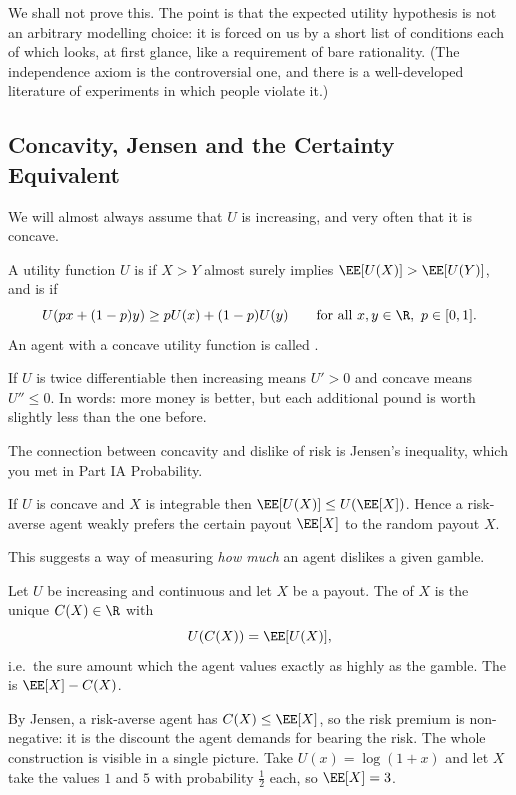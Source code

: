We shall not prove this. The point is that the expected utility hypothesis is not an arbitrary modelling choice: it is forced on us by a short list of conditions each of which looks, at first glance, like a requirement of bare rationality. (The independence axiom is the controversial one, and there is a well-developed literature of experiments in which people violate it.)

\subsection{Concavity, Jensen and the Certainty Equivalent}

We will almost always assume that $U$ is increasing, and very often that it is concave.

\begin{definition}
	A utility function $U$ is  if $X > Y$ almost surely implies $\EE[U(X)] > \EE[U(Y)]$, and is  if
	$$
	U(px + (1-p)y) \geq pU(x) + (1-p)U(y) \qquad \text{for all } x,y \in \R,\ p \in [0,1].
	$$
	An agent with a concave utility function is called .
\end{definition}

If $U$ is twice differentiable then increasing means $U' > 0$ and concave means $U'' \leq 0$. In words: more money is better, but each additional pound is worth slightly less than the one before.

The connection between concavity and dislike of risk is Jensen's inequality, which you met in Part IA Probability.

\begin{proposition}
	If $U$ is concave and $X$ is integrable then $\EE[U(X)] \leq U(\EE[X])$. Hence a risk-averse agent weakly prefers the certain payout $\EE[X]$ to the random payout $X$.
\end{proposition}

This suggests a way of measuring \emph{how much} an agent dislikes a given gamble.

\begin{definition}
	Let $U$ be increasing and continuous and let $X$ be a payout. The  of $X$ is the unique $C(X) \in \R$ with
	$$
	U(C(X)) = \EE[U(X)],
	$$
	i.e.\ the sure amount which the agent values exactly as highly as the gamble. The  is $\EE[X] - C(X)$.
\end{definition}

By Jensen, a risk-averse agent has $C(X) \leq \EE[X]$, so the risk premium is non-negative: it is the discount the agent demands for bearing the risk. The whole construction is visible in a single picture. Take $U(x) = \log(1+x)$ and let $X$ take the values $1$ and $5$ with probability $\tfrac12$ each, so $\EE[X] = 3$.

